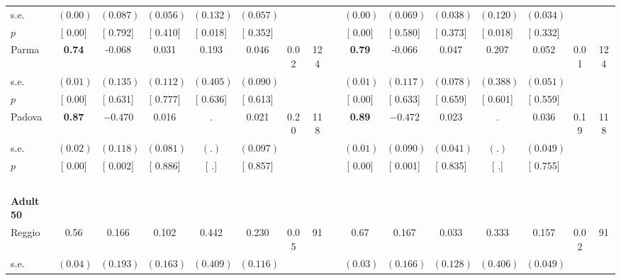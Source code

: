 \begin{longtable}{L{8em} c c c c c c c p{1em} c c c c c c c}
\quad \quad \quad \quad s.e.& $ (     0.00)$ & $ (    0.087)$ & $ (    0.056)$ & $ (    0.132)$ & $ (    0.057)$ & & & & $ (     0.00)$ & $ (    0.069)$ & $ (    0.038)$ & $ (    0.120)$ & $ (    0.034)$ & &  \\*
\quad \quad \quad \quad $ p$ & [     0.00] & [    0.792] & [    0.410] & [    0.018] & [    0.352] & & & & [     0.00] & [    0.580] & [    0.373] & [    0.018] & [    0.332] & &  \\[1em]
\quad \quad \quad Parma& \textbf{     0.74} &    -0.068 &     0.031 &     0.193 &     0.046 &      0.02 &       124 & & \textbf{     0.79} &    -0.066 &     0.047 &     0.207 &     0.052 &      0.01 &       124  \\*
\quad \quad \quad \quad s.e.& $ (     0.01)$ & $ (    0.135)$ & $ (    0.112)$ & $ (    0.405)$ & $ (    0.090)$ & & & & $ (     0.01)$ & $ (    0.117)$ & $ (    0.078)$ & $ (    0.388)$ & $ (    0.051)$ & &  \\*
\quad \quad \quad \quad $ p$ & [     0.00] & [    0.631] & [    0.777] & [    0.636] & [    0.613] & & & & [     0.00] & [    0.633] & [    0.659] & [    0.601] & [    0.559] & &  \\[1em]
\quad \quad \quad Padova& \textbf{     0.87} & $ \mathbf{   -0.470}$ &     0.016 &         . &     0.021 &      0.20 &       118 & & \textbf{     0.89} & $ \mathbf{   -0.472}$ &     0.023 &         . &     0.036 &      0.19 &       118  \\*
\quad \quad \quad \quad s.e.& $ (     0.02)$ & $ (    0.118)$ & $ (    0.081)$ & $ (        .)$ & $ (    0.097)$ & & & & $ (     0.01)$ & $ (    0.090)$ & $ (    0.041)$ & $ (        .)$ & $ (    0.049)$ & &  \\*
\quad \quad \quad \quad $ p$ & [     0.00] & [    0.002] & [    0.886] & [        .] & [    0.857] & & & & [     0.00] & [    0.001] & [    0.835] & [        .] & [    0.755] & &  \\[1em]
~\\[1em]
\quad \quad \textbf{Adult 50} & & & & & & & & & & & & & & & \\* 
\quad \quad \quad Reggio& 0.56 &     0.166 &     0.102 &     0.442 &     0.230 &      0.05 &        91 & & 0.67 &     0.167 &     0.033 &     0.333 &     0.157 &      0.02 &        91  \\*
\quad \quad \quad \quad s.e.& $ (     0.04)$ & $ (    0.193)$ & $ (    0.163)$ & $ (    0.409)$ & $ (    0.116)$ & & & & $ (     0.03)$ & $ (    0.166)$ & $ (    0.128)$ & $ (    0.406)$ & $ (    0.049)$ & &  \\*

\end{longtable}
